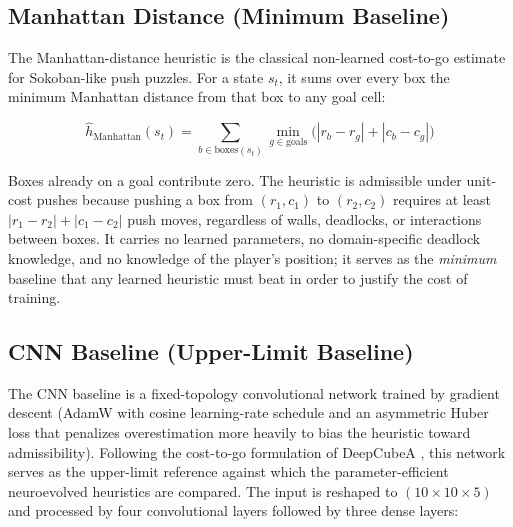 \subsection{Manhattan Distance (Minimum Baseline)}

The Manhattan-distance heuristic is the classical non-learned cost-to-go estimate for Sokoban-like push puzzles. For a state $s_t$, it sums over every box the minimum Manhattan distance from that box to any goal cell:

$$\hat{h}_{\text{Manhattan}}(s_t) = \sum_{b \in \text{boxes}(s_t)} \min_{g \in \text{goals}} \big( |r_b - r_g| + |c_b - c_g| \big)$$

Boxes already on a goal contribute zero. The heuristic is admissible under unit-cost pushes because pushing a box from $(r_1,c_1)$ to $(r_2,c_2)$ requires at least $|r_1-r_2|+|c_1-c_2|$ push moves, regardless of walls, deadlocks, or interactions between boxes. It carries no learned parameters, no domain-specific deadlock knowledge, and no knowledge of the player's position; it serves as the \emph{minimum} baseline that any learned heuristic must beat in order to justify the cost of training.

\subsection{CNN Baseline (Upper-Limit Baseline)}

The CNN baseline is a fixed-topology convolutional network trained by gradient descent (AdamW with cosine learning-rate schedule \cite{loshchilov2017decoupled} and an asymmetric Huber loss that penalizes overestimation more heavily to bias the heuristic toward admissibility). Following the cost-to-go formulation of DeepCubeA \cite{agostinelli2019solving, agostinelli2021admissible}, this network serves as the upper-limit reference against which the parameter-efficient neuroevolved heuristics are compared. The input is reshaped to $(10 \times 10 \times 5)$ and processed by four convolutional layers followed by three dense layers:

